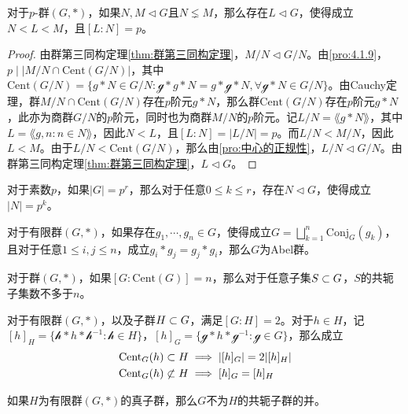 \begin{proposition}
	对于$p$-群$(G,*)$，如果$N,M\lhd G$且$N\lneq M$，那么存在$L\lhd G$，使得成立$N<L<M$，且$[L:N]=p$。
\end{proposition}

\begin{proof}
	由群第三同构定理\ref{thm:群第三同构定理}，$M/N\lhd G/N$。由\ref{pro:4.1.9}，$p\mid |M/N\cap\mathrm{Cent}(G/N)|$，其中$\mathrm{Cent}(G/N)=\{ g*N\in G/N:\mathcal{g}*g*N=g*\mathcal{g}*N,\forall \mathcal{g}*N\in G/N \}$。由Cauchy定理，群$M/N\cap\mathrm{Cent}(G/N)$存在$p$阶元$g*N$，那么群$\mathrm{Cent}(G/N)$存在$p$阶元$g*N$，此亦为商群$G/N$的$p$阶元，同时也为商群$M/N$的$p$阶元。记$L/N=\lang g*N\rang$，其中$L=\lang g,n:n\in N\rang$，因此$N<L$，且$[L:N]=|L/N|=p$。而$L/N<M/N$，因此$L<M$。由于$L/N<\mathrm{Cent}(G/N)$，那么由\ref{pro:中心的正规性}，$L/N\lhd G/N$。由群第三同构定理\ref{thm:群第三同构定理}，$L\lhd G$。
\end{proof}

\begin{corollary}
	对于素数$p$，如果$|G|=p^r$，那么对于任意$0\le k \le r$，存在$N\lhd G$，使得成立$|N|=p^k$。
\end{corollary}

\begin{proposition}
	对于有限群$(G,*)$，如果存在$g_1,\cdots,g_n\in G$，使得成立$\displaystyle G=\bigsqcup_{k=1}^{n}\mathrm{Conj}_G(g_k)$，且对于任意$1\le i,j\le n$，成立$g_i*g_j=g_j*g_i$，那么$G$为Abel群。
\end{proposition}

\begin{proposition}
	对于群$(G,*)$，如果$[G:\mathrm{Cent}(G)]=n$，那么对于任意子集$S\subset G$，$S$的共轭子集数不多于$n$。
\end{proposition}

\begin{proposition}
	对于有限群$(G,*)$，以及子群$H\subset G$，满足$[G:H]=2$。对于$h\in H$，记$[h]_{H}=\{ \mathcal{h}*h*\mathcal{h}^{-1}:\mathcal{h}\in H \}$，$[h]_{G}=\{ \mathcal{g}*h*\mathcal{g}^{-1}:\mathcal{g}\in G \}$，那么成立
	\begin{align*}
		&\mathrm{Cent}_G(h)\subset H\implies |[h]_G|=2|[h]_H|\\
		&\mathrm{Cent}_G(h)\not\subset H\implies [h]_G=[h]_H
	\end{align*}
\end{proposition}

\begin{proposition}
	如果$H$为有限群$(G,*)$的真子群，那么$G$不为$H$的共轭子群的并。
\end{proposition}

